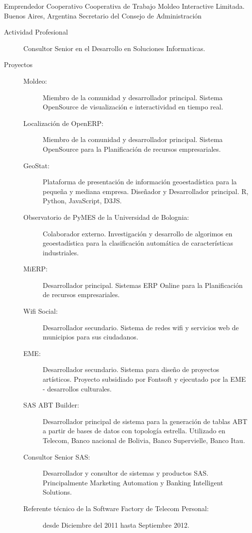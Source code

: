 	{Emprendedor Cooperativo}
	{Cooperativa de Trabajo Moldeo Interactive Limitada.}
	{Buenos Aires, Argentina}
	{Secretario del Consejo de Administración}
	{\begin{description}
	\item [Actividad Profesional] Consultor Senior en el Desarrollo en Soluciones Informaticas.
	\item [Proyectos]
	\begin{description}
		\item [Moldeo:] Miembro de la comunidad y desarrollador principal. Sistema OpenSource de visualización e interactividad en tiempo real.
		\item [Localización de OpenERP:] Miembro de la comunidad y desarrollador principal. Sistema OpenSource para la Planificación de recursos empresariales.
		\item [GeoStat:] Plataforma de presentación de información geoestadística para la pequeña y mediana empresa. Diseñador y Desarrollador principal. R, Python, JavaScript, D3JS.
		\item [Observatorio de PyMES de la Universidad de Bolognia:] Colaborador externo. Investigación y desarrollo de algorimos en geoestadística para la clasificación automática de características industriales.
		\item [MiERP:] Desarrollador principal. Sistemas ERP Online para la Planificación de recursos empresariales.
		\item [Wifi Social:] Desarrollador secundario. Sistema de redes wifi y servicios web de municipios para sus ciudadanos.
		\item [EME:] Desarrollador secundario. Sistema para diseño de proyectos artísticos. Proyecto subsidiado por Fontsoft y ejecutado por la EME - desarrollos culturales.
		\item [SAS ABT Builder:] Desarrollador principal de sistema para la generación de
			tablas ABT a partir de bases de datos con topología estrella. Utilizado
			en Telecom, Banco nacional de Bolivia, Banco Supervielle, Banco Itau.
		\item [Consultor Senior SAS:] Desarrollador y consultor de sistemas y productos SAS. Principalmente Marketing Automation y Banking Intelligent Solutions.
		\item [Referente técnico de la Software Factory de Telecom Personal:] desde Diciembre del 2011 hasta Septiembre 2012.
	\end{description}
	\end{description}}

